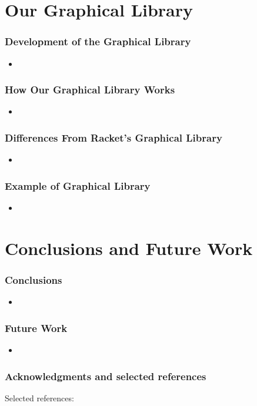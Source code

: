 \documentclass{beamer}
\begin{document}
\section{Our Graphical Library}

\begin{frame}
\frametitle{Development of the Graphical Library}
\begin{itemize}
\item
\end{itemize}
\end{frame}


\begin{frame}
\frametitle{How Our Graphical Library Works}
\begin{itemize}
\item
\end{itemize}
\end{frame}


\begin{frame}
\frametitle{Differences From Racket's Graphical Library}
\begin{itemize}
\item
\end{itemize}
\end{frame}

\begin{frame}
\frametitle{Example of Graphical Library}
\begin{itemize}
\item
\end{itemize}
\end{frame}


\section{Conclusions and Future Work}

\begin{frame}
\frametitle{Conclusions}
\begin{itemize}
\item
\end{itemize}
\end{frame}

\begin{frame}
\frametitle{Future Work}
\begin{itemize}
\item
\end{itemize}
\end{frame}

\begin{frame}
\frametitle{Acknowledgments and selected references}
Selected references:
\end{frame}
\end{document}
